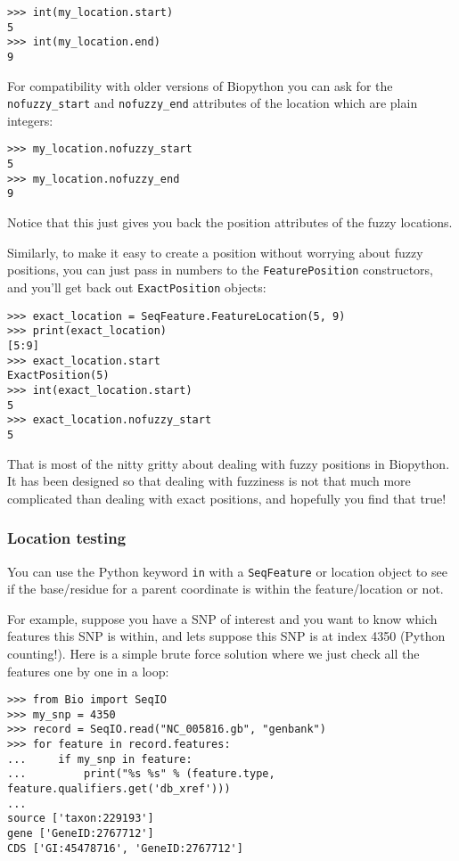\begin{verbatim}
>>> int(my_location.start)
5
>>> int(my_location.end)
9
\end{verbatim}

For compatibility with older versions of Biopython you can ask for the
\verb|nofuzzy_start| and \verb|nofuzzy_end| attributes of the location
which are plain integers:

\begin{verbatim}
>>> my_location.nofuzzy_start
5
>>> my_location.nofuzzy_end
9
\end{verbatim}

Notice that this just gives you back the position attributes of the fuzzy locations.

Similarly, to make it easy to create a position without worrying about fuzzy positions, you can just pass in numbers to the \verb|FeaturePosition| constructors, and you'll get back out \verb|ExactPosition| objects:

\begin{verbatim}
>>> exact_location = SeqFeature.FeatureLocation(5, 9)
>>> print(exact_location)
[5:9]
>>> exact_location.start
ExactPosition(5)
>>> int(exact_location.start)
5
>>> exact_location.nofuzzy_start
5
\end{verbatim}

That is most of the nitty gritty about dealing with fuzzy positions in Biopython.
It has been designed so that dealing with fuzziness is not that much more
complicated than dealing with exact positions, and hopefully you find that true!

\subsubsection{Location testing}

You can use the Python keyword \verb|in| with a \verb|SeqFeature| or location
object to see if the base/residue for a parent coordinate is within the
feature/location or not.

For example, suppose you have a SNP of interest and you want to know which
features this SNP is within, and lets suppose this SNP is at index 4350
(Python counting!). Here is a simple brute force solution where we just
check all the features one by one in a loop:

\begin{verbatim}
>>> from Bio import SeqIO
>>> my_snp = 4350
>>> record = SeqIO.read("NC_005816.gb", "genbank")
>>> for feature in record.features:
...     if my_snp in feature:
...         print("%s %s" % (feature.type, feature.qualifiers.get('db_xref')))
...
source ['taxon:229193']
gene ['GeneID:2767712']
CDS ['GI:45478716', 'GeneID:2767712']
\end{verbatim}

